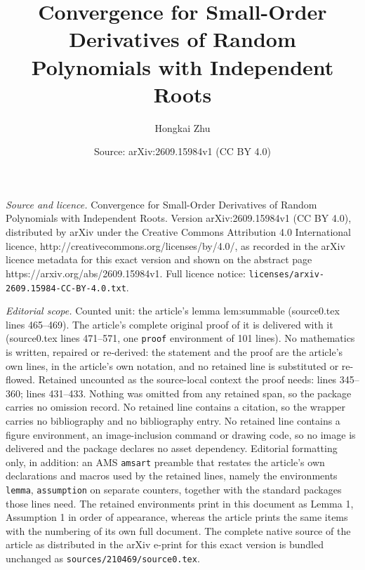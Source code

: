 \documentclass[10pt,a4paper]{amsart}
\title{Convergence for Small-Order Derivatives of Random Polynomials with Independent Roots}
\author{Hongkai Zhu}
\date{Source: arXiv:2609.15984v1 (CC BY 4.0)}
\begin{document}
\maketitle

\noindent\emph{Source and licence.} Convergence for Small-Order Derivatives of Random Polynomials with Independent Roots. Version arXiv:2609.15984v1 (CC BY 4.0), distributed by arXiv under the Creative Commons Attribution 4.0 International licence, http://creativecommons.org/licenses/by/4.0/, as recorded in the arXiv licence metadata for this exact version and shown on the abstract page https://arxiv.org/abs/2609.15984v1. Full licence notice: \texttt{licenses/arxiv-2609.15984-CC-BY-4.0.txt}.\par\smallskip

\noindent\textit{Editorial scope.} Counted unit: the article's lemma lem:summable (source0.tex lines 465--469). The article's complete original proof of it is delivered with it (source0.tex lines 471--571, one \texttt{proof} environment of 101 lines). No mathematics is written, repaired or re-derived: the statement and the proof are the article's own lines, in the article's own notation, and no retained line is substituted or re-flowed.  Retained uncounted as the source-local context the proof needs: lines 345--360; lines 431--433.  Nothing was omitted from any retained span, so the package carries no omission record.  No retained line contains a citation, so the wrapper carries no bibliography and no bibliography entry.  No retained line contains a figure environment, an image-inclusion command or drawing code, so no image is delivered and the package declares no asset dependency.  Editorial formatting only, in addition: an AMS \texttt{amsart} preamble that restates the article's own declarations and macros used by the retained lines, namely the environments \texttt{lemma}, \texttt{assumption} on separate counters, together with the standard packages those lines need.  The retained environments print in this document as Lemma 1, Assumption 1 in order of appearance, whereas the article prints the same items with the numbering of its own full document.  The complete native source of the article as distributed in the arXiv e-print for this exact version is bundled unchanged as \texttt{sources/210469/source0.tex}.
\end{document}
